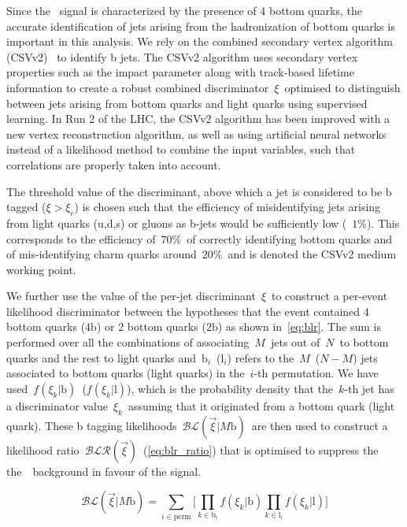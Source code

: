 Since the \ttHbb~signal is characterized by the presence of 4 bottom quarks, the accurate identification of jets arising from the hadronization of bottom quarks is important in this analysis. We rely on the combined secondary vertex algorithm (CSVv2)~\cite{Chatrchyan:2012jua} to identify b jets. The CSVv2 algorithm uses secondary vertex properties such as the impact parameter along with track-based lifetime information to create a robust combined discriminator~$\xi$~optimised to distinguish between jets arising from bottom quarks and light quarks using supervised learning. In Run 2 of the LHC, the CSVv2 algorithm has been improved with a new vertex reconstruction algorithm, as well as using artificial neural networks instead of a likelihood method to combine the input variables, such that correlations are properly taken into account\cite{CMS-PAS-BTV-15-001}.

The threshold value of the discriminant, above which a jet is considered to be b tagged ($\xi > \xi_c$) is chosen such that the efficiency of misidentifying jets arising from light quarks (u,d,s) or gluons as b-jets would be sufficiently low (~$1\%$). This corresponds to the efficiency of~$70\%$~of correctly identifying bottom quarks and of mis-identifying charm quarks around~$20\%$~and is denoted the CSVv2 medium working point.

We further use the value of the per-jet discriminant~$\xi$~to construct a per-event likelihood discriminator between the hypotheses that the event contained 4 bottom quarks ($4\mathrm{b}$) or 2 bottom quarks ($2\mathrm{b}$) as shown in~\cref{eq:blr}. The sum is performed over all the combinations of associating~$M$~jets out of~$N$~to bottom quarks and the rest to light quarks and~$\mathrm{b}_i$~($\mathrm{l}_i$) refers to the~$M$~($N-M$) jets associated to bottom quarks (light quarks) in the~$i$-th permutation. We have used~$f(\xi_k | \mathrm{b})$~($f(\xi_k | \mathrm{l})$), which is the probability density that the~$k$-th jet has a discriminator value~$\xi_k$~assuming that it originated from a bottom quark (light quark). These b tagging likelihoods~$\mathcal{BL}(\vec{\xi} | M\mathrm{b})$~are then used to construct a likelihood ratio~$\mathcal{BLR}(\vec{\xi})$~(\cref{eq:blr_ratio}) that is optimised to suppress the the~\ttlf~background in favour of the \ttHbb signal.

\begin{equation}
\label{eq:blr}
\mathcal{BL}(\vec{\xi} | M\mathrm{b}) = \sum_{i \in \mathrm{perm}} \biggl[ \prod_{k \in \mathrm{b}_i} f(\xi_k | \mathrm{b}) \prod_{k \in \mathrm{l}_i} f(\xi_k | \mathrm{l}) \biggr]
\end{equation}

